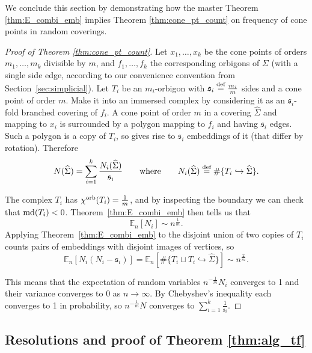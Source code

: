 \documentclass{amsart}
\newcommand{\cho}{\chi^{\textnormal{orb}}}
\newcommand{\defeq}{\stackrel{\tn{def}}{=}}
\newcommand{\md}{\textnormal{md}}
\newcommand{\tn}{\textnormal}
\newcommand{\whS}{{\widehat{\Sigma}}}
\begin{document}
We conclude this section by demonstrating how the master Theorem \ref{thm:E_combi_emb} implies Theorem \ref{thm:cone_pt_count} on frequency of cone points in random coverings.
\begin{proof}[Proof of Theorem \ref{thm:cone_pt_count}]
Let $x_1,\dots,x_k$ be the cone points of orders $m_1,\dots,m_k$ divisible by $m$, and $f_1,\dots,f_k$ the corresponding orbigons of $\Sigma$ (with a single side edge, according to our convenience convention from Section~\ref{sec:simplicial}). Let $T_i$ be an $m_i$-orbigon with $\mathfrak{s}_i\defeq\tfrac{m_i}{m}$ sides and a cone point of order $m$. Make it into an immersed complex by considering it as an $\mathfrak{s}_i$-fold branched covering of $f_i$. A cone point of order $m$ in a covering $\whS$ and mapping to $x_i$ is surrounded by a polygon mapping to $f_i$ and having $\mathfrak{s}_i$ edges. Such a polygon is a copy of $T_i$, so gives rise to $\mathfrak{s}_i$ embeddings of it (that differ by rotation). Therefore
\begin{equation*}
N(\whS)=\sum_{i=1}^k\frac{N_i(\whS)}{\mathfrak{s_i}}\qquad\text{where}\qquad N_i(\whS)\defeq\#\{T_i\hookrightarrow\whS\}.
\end{equation*}

The complex $T_i$ has $\cho(T_i)=\tfrac{1}{m}$, and by inspecting the boundary we can check that $\md(T_i)<0$. Theorem~\ref{thm:E_combi_emb} then tells us that
\begin{equation*}
\mathbb{E}_n[N_i]\sim n^{\frac{1}{m}}.
\end{equation*}
Applying Theorem~\ref{thm:E_combi_emb} to the disjoint union of two copies of $T_i$ counts pairs of embeddings with disjoint images of vertices, so
\begin{equation*}
\mathbb{E}_n[N_i(N_i-\mathfrak{s}_i)]=\mathbb{E}_n[\#\{T_i\sqcup T_i\hookrightarrow\whS\}]\sim n^{\frac{2}{m}}.
\end{equation*}

This means that the expectation of random variables $n^{-\frac{1}{m}}N_i$ converges to 1 and their variance converges to 0 as $n\to\infty$. By Chebyshev's inequality each converges to 1 in probability, so $n^{-\frac{1}{m}}N$ converges to $\sum_{i=1}^k\tfrac{1}{\mathfrak{s}_i}$.
\end{proof}

\subsection{Resolutions and proof of Theorem \ref{thm:alg_tf}}\label{ssec:res_main_pf}
\end{document}
